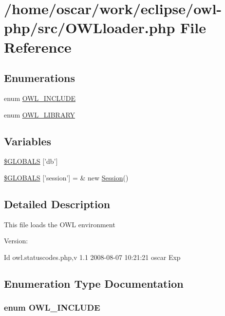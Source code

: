 \hypertarget{OWLloader_8php}{
\section{/home/oscar/work/eclipse/owl-php/src/OWLloader.php File Reference}
\label{OWLloader_8php}
}
\subsection*{Enumerations}
\begin{CompactItemize}
\item 
enum \hyperlink{OWLloader_8php_4d33a8f2fcc9c83cbeea921c4cb23a7f}{OWL\_\-INCLUDE} 
\item 
enum \hyperlink{OWLloader_8php_74eed08508c8b70677c4167acf49e427}{OWL\_\-LIBRARY} 
\end{CompactItemize}
\subsection*{Variables}
\begin{CompactItemize}
\item 
\hyperlink{OWLloader_8php_14159e18d9b64fd1e16054f784eda311}{\$GLOBALS} \mbox{[}'db'\mbox{]}
\item 
\hyperlink{OWLloader_8php_95ec104c636100b9022c09964e2b0725}{\$GLOBALS} \mbox{[}'session'\mbox{]} = \& new \hyperlink{classSession}{Session}()
\end{CompactItemize}


\subsection{Detailed Description}
This file loads the OWL environment \begin{Desc}
\item[Version:]\end{Desc}
\begin{Desc}
\item[Id]owl.statuscodes.php,v 1.1 2008-08-07 10:21:21 oscar Exp \end{Desc}


\subsection{Enumeration Type Documentation}
\hypertarget{OWLloader_8php_4d33a8f2fcc9c83cbeea921c4cb23a7f}{
\subsubsection{\setlength{\rightskip}{0pt plus 5cm}enum {\bf OWL\_\-INCLUDE}}}
\label{OWLloader_8php_4d33a8f2fcc9c83cbeea921c4cb23a7f}


